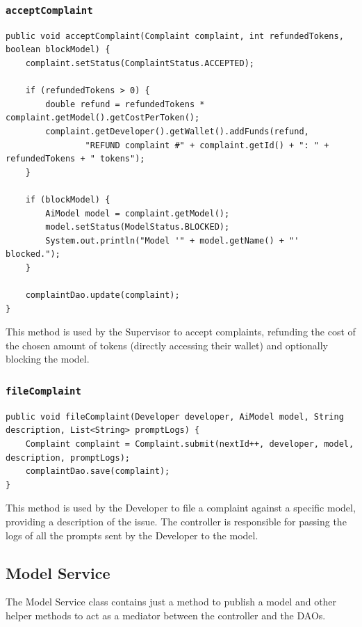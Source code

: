 \documentclass[a4paper,11pt]{report}
\begin{document}
\subsubsection{\texttt{acceptComplaint}}
\begin{lstlisting}[label={lst:acceptcomplaint}]
public void acceptComplaint(Complaint complaint, int refundedTokens, boolean blockModel) {
    complaint.setStatus(ComplaintStatus.ACCEPTED);

    if (refundedTokens > 0) {
        double refund = refundedTokens * complaint.getModel().getCostPerToken();
        complaint.getDeveloper().getWallet().addFunds(refund,
                "REFUND complaint #" + complaint.getId() + ": " + refundedTokens + " tokens");
    }

    if (blockModel) {
        AiModel model = complaint.getModel();
        model.setStatus(ModelStatus.BLOCKED);
        System.out.println("Model '" + model.getName() + "' blocked.");
    }

    complaintDao.update(complaint);
}
\end{lstlisting}

This method is used by the Supervisor to accept complaints, refunding the cost of the chosen amount of tokens (directly accessing their wallet) and optionally blocking the model.

\subsubsection{\texttt{fileComplaint}}
\begin{lstlisting}[label={lst:filecomplaint}]
public void fileComplaint(Developer developer, AiModel model, String description, List<String> promptLogs) {
    Complaint complaint = Complaint.submit(nextId++, developer, model, description, promptLogs);
    complaintDao.save(complaint);
}
\end{lstlisting}

This method is used by the Developer to file a complaint against a specific model, providing a description of the issue. The controller is responsible for passing the logs of all the prompts sent by the Developer to the model.
\subsection{Model Service}
The Model Service class contains just a method to publish a model and other helper methods to act as a mediator between the controller and the DAOs. 
\end{document}
